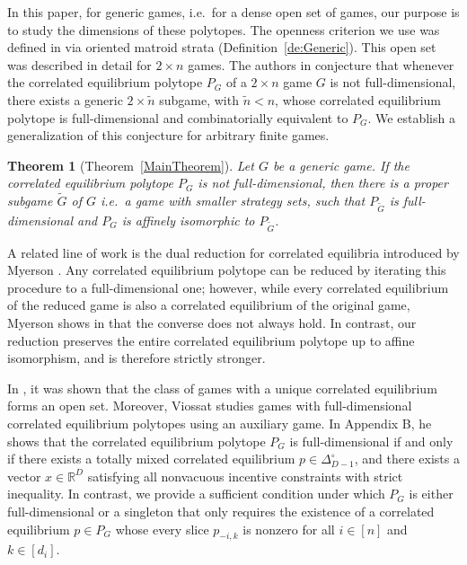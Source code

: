 \documentclass[11pt]{amsart}
\newtheorem{theorem}{Theorem}[section]
\theoremstyle{definition}
\numberwithin{subcase}{case}
\renewcommand{\tilde}[1]{\widetilde{#1}}
\begin{document}
In this paper, for generic games, i.e.\ for a dense open set of games, our purpose is to study the dimensions of these polytopes. The openness criterion we use was defined in \cite[Section 5]{CombCorrEquilibria} via oriented matroid strata (Definition~\ref{de:Generic}). This open set was described in detail for $2\times n$ games. The authors in \cite[Conjecture 5.1]{combinatorics-correlated-equilibria} conjecture that whenever the correlated equilibrium polytope $P_G$ of a $2\times n$ game $G$ is not full-dimensional, there exists a generic $2\times\tilde{n}$ subgame, with $\tilde{n}<n$, whose correlated equilibrium polytope is full-dimensional and combinatorially equivalent to $P_G$. We establish a generalization of this conjecture for arbitrary finite games.

\begin{theorem}[{Theorem~\ref{MainTheorem}}]
Let $G$ be a generic game. If the correlated equilibrium polytope $P_G$ is not full-dimensional, then there is
a proper subgame $\tilde{G}$ of $G$ i.e.\ a game with smaller strategy sets, such that $P_{\tilde{G}}$ is full-dimensional and $P_G$ is affinely isomorphic to $P_{\tilde{G}}$.
\end{theorem}

A related line of work is the dual reduction for correlated equilibria introduced by Myerson \cite{MYERSON1997183}. Any correlated equilibrium polytope can be reduced by iterating this procedure to a full-dimensional one; however, while every correlated equilibrium of the reduced game is also a correlated equilibrium of the original game, Myerson shows in \cite[Section 5]{MYERSON1997183} that the converse does not always hold. In contrast, our reduction preserves the entire correlated equilibrium polytope up to affine isomorphism, and is therefore strictly stronger. 

In \cite[Proposition 1]{VIOSSAT20081152}, it was shown that the class of games with a unique correlated equilibrium forms an open set. Moreover, Viossat \cite{viossat2003elementary} studies games with full-dimensional correlated equilibrium polytopes using an auxiliary game. In Appendix B, he shows that the correlated equilibrium polytope $P_G$ is full-dimensional if and only if there exists a totally mixed correlated equilibrium $p \in \Delta^{\circ}_{D-1}$, and there exists a vector $x \in\mathbb{R}^D$ satisfying all nonvacuous incentive constraints with strict inequality. In contrast, we provide a sufficient condition under which $P_G$ is either full-dimensional or a singleton that only requires the existence of a correlated equilibrium $p\in P_G$ whose every slice $p_{-i,k}$ is nonzero for all $i\in[n]$ and $k\in[d_i]$.
\end{document}
